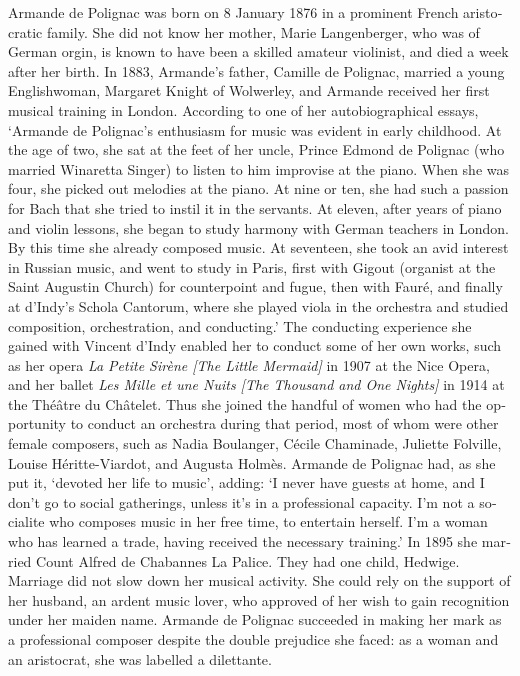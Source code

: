 \documentclass[a4paper, 12pt]{book}
\begin{document}
\begin{otherlanguage}{english}
Armande de Polignac was born on 8 January 1876 in a prominent French
aristocratic family. She did not know her mother, Marie Langenberger,
who was of German orgin, is known to have been a skilled amateur
violinist, and died a week after her birth. In 1883, Armande's father,
Camille de Polignac, married a young Englishwoman, Margaret Knight of
Wolwerley, and Armande received her first musical training in
London. According to one of her autobiographical essays, `Armande de
Polignac's enthusiasm for music was evident in early childhood. At the
age of two, she sat at the feet of her uncle, Prince Edmond de
Polignac (who married Winaretta Singer) to listen to him improvise at
the piano. When she was four, she picked out melodies at the piano. At
nine or ten, she had such a passion for Bach that she tried to instil
it in the servants. At eleven, after years of piano and violin
lessons, she began to study harmony with German teachers in London. By
this time she already composed music. At seventeen, she took an avid
interest in Russian music, and went to study in Paris, first with
Gigout (organist at the Saint Augustin Church) for counterpoint and
fugue, then with Fauré, and finally at d'Indy's Schola Cantorum, where
she played viola in the orchestra and studied composition,
orchestration, and conducting.' The conducting experience she gained
with Vincent d'Indy enabled her to conduct some of her own works, such
as her opera \emph{La Petite Sirène [The Little Mermaid]} in 1907 at
the Nice Opera, and her ballet \emph{Les Mille et une Nuits [The
  Thousand and One Nights]} in 1914 at the Théâtre du Châtelet. Thus
she joined the handful of women who had the opportunity to conduct an
orchestra during that period, most of whom were other female
composers, such as Nadia Boulanger, Cécile Chaminade, Juliette
Folville, Louise Héritte-Viardot, and Augusta Holmès. Armande de
Polignac had, as she put it, `devoted her life to music', adding: `I
never have guests at home, and I don't go to social gatherings, unless
it's in a professional capacity. I'm not a socialite who composes
music in her free time, to entertain herself. I'm a woman who has
learned a trade, having received the necessary training.' In 1895 she
married Count Alfred de Chabannes La Palice. They had one child,
Hedwige. Marriage did not slow down her musical activity. She could
rely on the support of her husband, an ardent music lover, who
approved of her wish to gain recognition under her maiden
name. Armande de Polignac succeeded in making her mark as a
professional composer despite the double prejudice she faced: as a
woman and an aristocrat, she was labelled a dilettante.


\end{otherlanguage}
\end{document}
